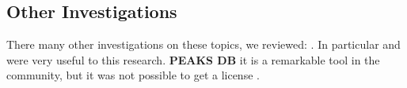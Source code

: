  \subsection{Other Investigations}
 \label{section:other-investigations}
 There many other investigations on these topics, we reviewed: \cite{Danick1999DeSpectrometry, Chen2001ASpectrometry, Guthals2015TheNetworks, Bandeira2008Multi-spectraSpectrometry, Lu2003ASpectrometry, Taylor1997SequenceSpectrometry, Johnson2002SearchingSpectrometry., Taylor2001ImplementationSpectrometry., Grossmann2005AUDENS:Sequencing, Fischer2005NovoHMM:Sequencing}. 
 In particular \citeauthor{Chen2001ASpectrometry} \cite{Chen2001ASpectrometry} and \citeauthor{Bandeira2008Multi-spectraSpectrometry} \cite{Bandeira2008Multi-spectraSpectrometry} were very useful to this research. \textbf{PEAKS DB} it is a remarkable tool in the community, but it was not possible to get a license  \cite{Zhang2012PEAKSIdentification}.